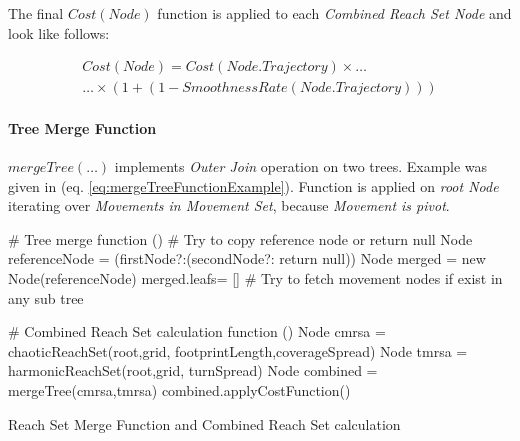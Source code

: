 \noindent The final $Cost(Node)$ function is applied to each \emph{Combined Reach Set Node} and look like follows:

\begin{multline}
    Cost(Node) = Cost(Node.Trajectory) \times\dots\\\dots\times \left(1+ \left(1-SmoothnessRate(N ode.T rajectory)\right)\right)
\end{multline}

\newpage

\paragraph{Tree Merge Function} $mergeTree(\dots)$ implements \emph{Outer Join} operation on two trees. Example was given in (eq. \ref{eq:mergeTreeFunctionExample}).
Function is applied on \emph{root Node} iterating over \emph{Movements in Movement Set}, because \emph{Movement is pivot}.

\begin{algorithm}[H]
    
    \BlankLine
    \# Tree merge function\;
    \Fn(){}{
        \BlankLine
        \# Try to copy reference node or return null\;
        Node referenceNode = (firstNode?:(secondNode?: return null))\;
        Node merged =  new Node(referenceNode)\;
        merged.leafs= []\;
        \BlankLine
        \# Try to fetch movement nodes if exist in any sub tree\;
    }{}
    
    \BlankLine
    \# Combined Reach Set calculation function\;
    \Fn(){}{
        Node cmrsa = chaoticReachSet(root,grid, footprintLength,coverageSpread)\;
        Node tmrsa = harmonicReachSet(root,grid, turnSpread)\;
        Node combined = mergeTree(cmrsa,tmrsa)\;
        combined.applyCostFunction()\;
    }

    
    \caption{Reach Set Merge Function and Combined Reach Set calculation}
    \label{alg:ReachSetMerge}
\end{algorithm}

